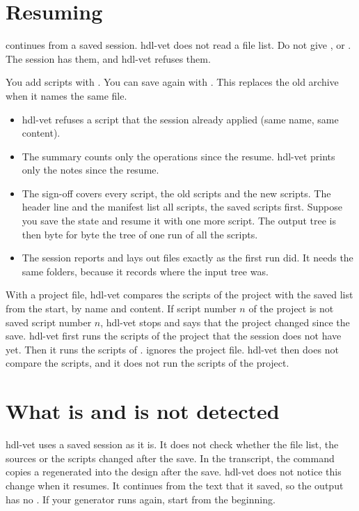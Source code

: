 \section{Resuming}

  continues from a saved session. hdl-vet does not read a file list.
Do not give ,  or . The session has them, and hdl-vet
refuses them.

You add scripts with . You can save again with . This
replaces the old archive when it names the same file.

\begin{itemize}
\item hdl-vet refuses a script that the session already applied (same name, same
  content).
\item The summary counts only the operations since the resume. hdl-vet prints only the
  notes since the resume.
\item The sign-off covers every script, the old scripts and the new scripts. The header
  line and the manifest list all scripts, the saved scripts first. Suppose you save the
  state and resume it with one more script. The output tree is then byte for byte the tree
  of one run of all the scripts.
\item The session reports and lays out files exactly as the first run did. It needs the
  same folders, because it records where the input tree was.
\end{itemize}

With a project file, hdl-vet compares the scripts of the project with the saved list from
the start, by name and content. If script number $n$ of the project is not saved script
number $n$, hdl-vet stops and says that the project changed since the save.
hdl-vet first runs the scripts of the project that the session does not have yet. Then it
runs the scripts of .  ignores the project file. hdl-vet then
does not compare the scripts, and it does not run the scripts of the project.



\section{What is and is not detected}

hdl-vet uses a saved session as it is. It does not check whether the file list, the
sources or the scripts changed after the save. In the transcript, the command 
copies a regenerated  into the design after the save. hdl-vet does not
notice this change when it resumes. It continues from the text that it saved, so the
output has no . If your generator runs again, start from the beginning.

